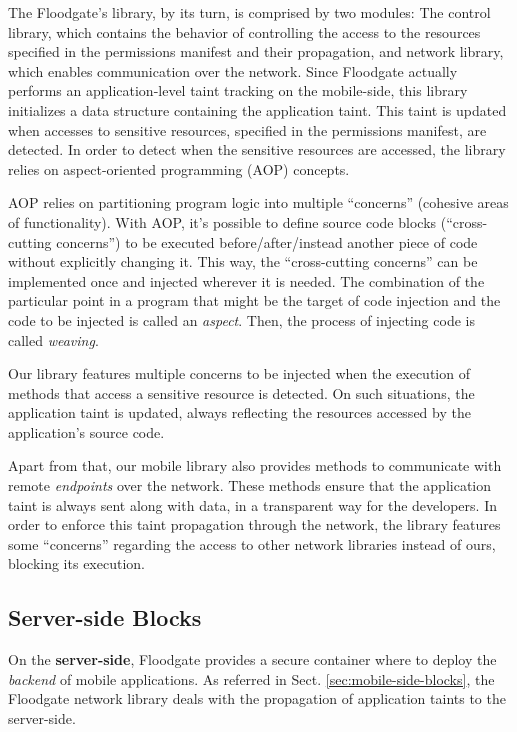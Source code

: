 The Floodgate's library, by its turn, is comprised by two modules: The control library, which contains the behavior of controlling the access to the resources specified in the permissions manifest and their propagation, and network library, which enables communication over the network. Since Floodgate actually performs an application-level taint tracking on the mobile-side, this library initializes a data structure containing the application taint. This taint is updated when accesses to sensitive resources, specified in the permissions manifest, are detected. In order to detect when the sensitive resources are accessed, the library relies on aspect-oriented programming (AOP) concepts.

AOP relies on partitioning program logic into multiple ``concerns'' (cohesive areas of functionality). With AOP, it's possible to define source code blocks (``cross-cutting concerns'') to be executed before/after/instead another piece of code without explicitly changing it. This way, the ``cross-cutting concerns'' can be implemented once and injected wherever it is needed. The combination of the particular point in a program that might be the target of code injection and the code to be injected is called an \textit{aspect}. Then, the process of injecting code is called \textit{weaving}.

Our library features multiple concerns to be injected when the execution of methods that access a sensitive resource is detected. On such situations, the application taint is updated, always reflecting the resources accessed by the application's source code.

Apart from that, our mobile library also provides methods to communicate with remote \textit{endpoints} over the network.
These methods ensure that the application taint is always sent along with data, in a transparent way for the developers. In order to enforce this taint propagation through the network, the library features some ``concerns'' regarding the access to other network libraries instead of ours, blocking its execution.

\subsection{Server-side Blocks}
\label{sec:server-side-blocks}

On the \textbf{server-side}, Floodgate provides a secure container where to deploy the \textit{backend} of mobile applications. As referred in Sect. \ref{sec:mobile-side-blocks}, the Floodgate network library deals with the propagation of application taints to the server-side. 


